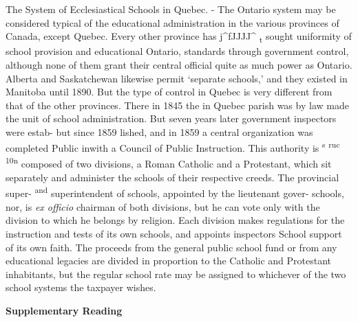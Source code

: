 \documentclass[
]{book}
\begin{document}
The System of Ecclesiastical Schools in Quebec. - \protect\hypertarget{ch25.xmlux5cux23para.474.1.0.box.93.248.1275.1452.q.60}{}{ The Ontario system may be considered typical of the educational administration in the various provinces of Canada, except Quebec. Every other province has j\^{}fJJJJ\^{} \textsubscript{t} sought uniformity of school provision and educational Ontario, standards through government control, although none of them grant their central official quite as much power as Ontario. Alberta and Saskatchewan likewise permit `separate schools,' and they existed in Manitoba until 1890. But the type of control in Quebec is very different from that of the other provinces. There in 1845 the in Quebec parish was by law made the unit of school administration. But seven years later government inspectors were estab- but since 1859 lished, and in 1859 a central organization was completed Public inwith a Council of Public Instruction. This authority is \textsuperscript{s} \textsuperscript{ruc} \textsuperscript{10n} composed of two divisions, a Roman Catholic and a Protestant, which sit separately and administer the schools of their respective creeds. The provincial super- \textsuperscript{and} superintendent of schools, appointed by the lieutenant gover- schools, nor, is \emph{ex officio} chairman of both divisions, but he can vote only with the division to which he belongs by religion. Each division makes regulations for the instruction and tests of its own schools, and appoints inspectors School support of its own faith. The proceeds from the general public school fund or from any educational legacies are divided in proportion to the Catholic and Protestant inhabitants, but the regular school rate may be assigned to whichever of the two school systems the taxpayer wishes.}

\textbf{Supplementary Reading}
\end{document}
